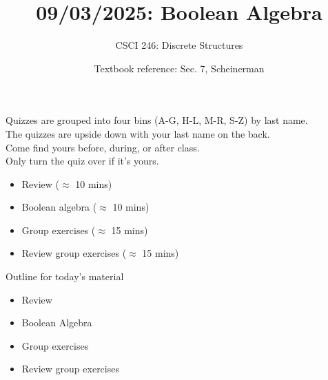 \documentclass[10pt]{beamer}
\begin{document}






\title{09/03/2025: Boolean Algebra}
\author{CSCI 246: Discrete Structures}
\date{Textbook reference: Sec. 7, Scheinerman}

\begin{frame}
    \titlepage 
\end{frame}




\begin{frame}

\vfill 
\begin{mygreenbox}[title=Quiz return method]
Quizzes are grouped into four bins (A-G, H-L, M-R, S-Z) by last name. \\
The quizzes are upside down with your last name on the back. \\
Come find yours before, during, or after class. \\
Only turn the quiz over if it's yours.
\end{mygreenbox} 
\vfill 

\begin{myyellowbox}[title=Today's Agenda]
\begin{itemize}
	\item Review  ($\approx$ 10 mins)
	\item Boolean algebra ($\approx$ 10 mins)
	\item Group exercises ($\approx$ 15 mins)
	\item Review group exercises ($\approx$ 15 mins)	
\end{itemize}

\end{myyellowbox}
\end{frame}






\begin{frame}[standout]
Outline for today's material
\begin{itemize}
\item \textbullet \quad \alert{Review}
\item \textbullet \quad Boolean Algebra
\item \textbullet \quad Group exercises
\item \textbullet \quad Review group exercises
\end{itemize}

\end{frame}
\end{document}
